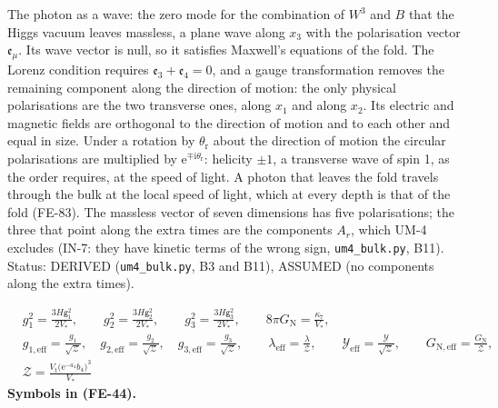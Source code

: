 \documentclass[
  10pt,
]{article}
\begin{document}
The photon as a wave: the zero mode for the combination of \(W^3\) and
\(B\) that the Higgs vacuum leaves massless, a plane wave along \(x_3\)
with the polarisation vector \(\mathfrak{e}_\mu\). Its wave vector is
null, so it satisfies Maxwell's equations of the fold. The Lorenz
condition requires \(\mathfrak{e}_3 + \mathfrak{e}_4 = 0\), and a gauge
transformation removes the remaining component along the direction of
motion: the only physical polarisations are the two transverse ones,
along \(x_1\) and along \(x_2\). Its electric and magnetic fields are
orthogonal to the direction of motion and to each other and equal in
size. Under a rotation by \(\theta_{\mathrm{r}}\) about the direction of
motion the circular polarisations are multiplied by
\(\mathrm{e}^{\mp\mathrm{i}\theta_{\mathrm{r}}}\): helicity \(\pm1\), a
transverse wave of spin 1, as the order requires, at the speed of light.
A photon that leaves the fold travels through the bulk at the local
speed of light, which at every depth is that of the fold (FE-83). The
massless vector of seven dimensions has five polarisations; the three
that point along the extra times are the components \(A_r\), which UM-4
excludes (IN-7: they have kinetic terms of the wrong sign,
\texttt{um4\_bulk.py}, B11). Status: DERIVED (\texttt{um4\_bulk.py}, B3
and B11), ASSUMED (no components along the extra times).

\[
\begin{aligned}
&g_1^2 = \frac{3H\mathsf{g}_1^2}{2V_*},\qquad g_2^2 = \frac{3H\mathsf{g}_2^2}{2V_*},\qquad g_3^2 = \frac{3H\mathsf{g}_3^2}{2V_*},\qquad
 8\pi G_{\mathrm{N}} = \frac{\kappa_7}{V_*},\\
&g_{1,\mathrm{eff}} = \frac{g_1}{\sqrt{\mathcal{Z}}},\quad g_{2,\mathrm{eff}} = \frac{g_2}{\sqrt{\mathcal{Z}}},\quad g_{3,\mathrm{eff}} = \frac{g_3}{\sqrt{\mathcal{Z}}},\qquad \lambda_{\mathrm{eff}} = \frac{\lambda}{\mathcal{Z}},\qquad
 \mathcal{Y}_{\mathrm{eff}} = \frac{\mathcal{Y}}{\sqrt{\mathcal{Z}}},\qquad G_{\mathrm{N,eff}} = \frac{G_{\mathrm{N}}}{\mathcal{Z}},\\
&\mathcal{Z} = \frac{V_{\mathrm{t}}\big(\mathrm{e}^{-a_4}b_4\big)^3}{V_*}
\end{aligned} \tag{FE-44}
\] \textbf{Symbols in (FE-44).}
\end{document}
